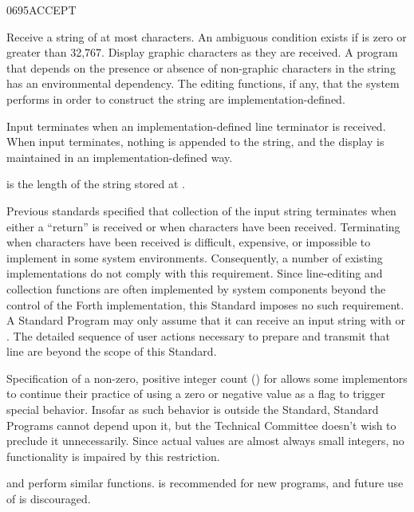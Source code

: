 \begin{worddef}{0695}{ACCEPT}
\item {}

	Receive a string of at most  characters. An ambiguous
	condition exists if  is zero or greater than 32,767.
	Display graphic characters as they are received. A program that
	depends on the presence or absence of non-graphic characters in the
	string has an environmental dependency. The editing functions, if
	any, that the system performs in order to construct the string are
	implementation-defined.

	Input terminates when an implementation-defined line terminator is
	received. When input terminates, nothing is appended to the string,
	and the display is maintained in an implementation-defined way.

	 is the length of the string stored at .

	\begin{defer}
	\rationale %
		Previous standards specified that collection of the input
		string terminates when either a ``return'' is received or when
		 characters have been received. Terminating when
		 characters have been received is difficult,
		expensive, or impossible to implement in some system environments.
		Consequently, a number of existing implementations do not
		comply with this requirement. Since line-editing and collection
		functions are often implemented by system components beyond the
		control of the Forth implementation, this Standard imposes no
		such requirement. A Standard Program may only assume that it
		can receive an input string with  or .
		The detailed sequence of user actions necessary to prepare and
		transmit that line are beyond the scope of this Standard.

		Specification of a non-zero, positive integer count ()
		for  allows some implementors to continue their
		practice of using a zero or negative value as a flag to trigger
		special behavior. Insofar as such behavior is outside the
		Standard, Standard Programs cannot depend upon it, but the
		Technical Committee doesn't wish to preclude it unnecessarily.
		Since actual values are almost always small integers, no
		functionality is impaired by this restriction.

		 and  perform similar functions.
		 is recommended for new programs, and future use
		of  is discouraged.


\end{defer}
\end{worddef}
